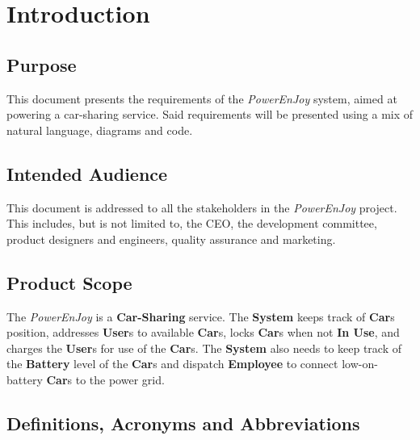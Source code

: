 \section{Introduction}

\subsection{Purpose}
This document presents the requirements of the \emph{PowerEnJoy} system, aimed at powering a car-sharing service. Said requirements will be presented using a mix of natural language, diagrams and code.

\subsection{Intended Audience}
This document is addressed to all the stakeholders in the \emph{PowerEnJoy} project. This includes, but is not limited to, the CEO, the development committee, product designers and engineers, quality assurance and marketing.

\subsection{Product Scope}
The \emph{PowerEnJoy} is a \textbf{Car-Sharing} service. 
The \textbf{System} keeps track of \textbf{Car}s position, addresses \textbf{User}s to available \textbf{Car}s, locks \textbf{Car}s when not \textbf{In Use}, and charges the \textbf{User}s for use of the \textbf{Car}s. 
The \textbf{System} also needs to keep track of the \textbf{Battery} level of the \textbf{Car}s and dispatch \textbf{Employee} to connect low-on-battery \textbf{Car}s to the power grid.

\subsection{Definitions, Acronyms and Abbreviations}
